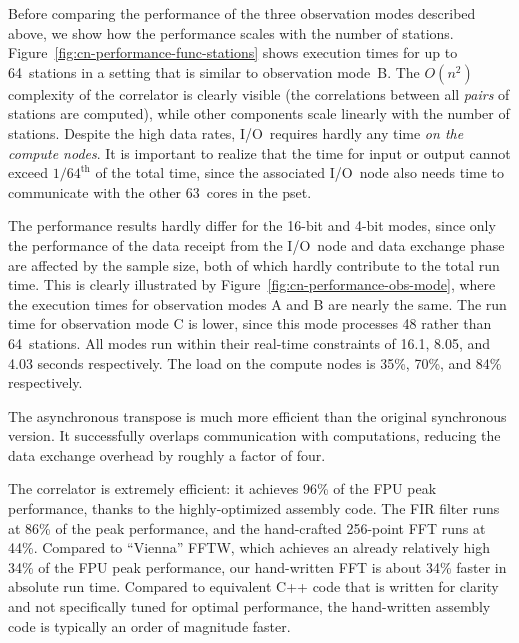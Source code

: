 \documentclass{sig-alternate}
\begin{document}
Before comparing the performance of the three observation modes described
above, we show how the performance scales with the number of stations.
Figure~\ref{fig:cn-performance-func-stations} shows execution times for up to
64~stations in a setting that is similar to observation mode~\textsf{B}.
The $O(n^2)$ complexity of the correlator is clearly visible (the correlations
between all \emph{pairs\/} of stations are computed), while other
components scale linearly with the number of stations.
Despite the high data rates, I/O~requires hardly any time \emph{on the compute nodes}.
It is important to realize that the time for input or output cannot exceed
$1/64^\mathrm{th}$ of the total time, since the associated I/O~node also needs
time to communicate with the other 63~cores in the pset.


The performance results hardly differ for the 16-bit and 4-bit modes,
since only the performance of the data receipt from the I/O~node and data
exchange phase are affected by the sample size, 
both of which hardly contribute to the total run time.
This is clearly illustrated by Figure~\ref{fig:cn-performance-obs-mode},
where the execution times for observation modes \textsf{A} and \textsf{B}
are nearly the same.
The run time for observation mode \textsf{C} is lower, since this mode
processes 48 rather than 64~stations.
All modes run within their real-time constraints of 16.1, 8.05, and 4.03
seconds respectively.
The load on the compute nodes is 35\%, 70\%, and 84\% respectively.

The asynchronous transpose is much more efficient than the original synchronous
version. It successfully overlaps communication with computations, reducing
the data exchange overhead by roughly a factor of four.

The correlator is extremely efficient: it achieves 96\% of the FPU
peak performance, thanks to the highly-optimized assembly code.  The
FIR filter runs at 86\% of the peak performance, and the hand-crafted
256-point FFT runs at 44\%.  Compared to ``Vienna'' FFTW, which
achieves an already relatively high 34\% of the FPU peak performance,
our hand-written FFT is about 34\% faster in absolute run
time. Compared to equivalent C++ code that is written for clarity and
not specifically tuned for optimal performance, the hand-written
assembly code is typically an order of magnitude faster.
\end{document}
